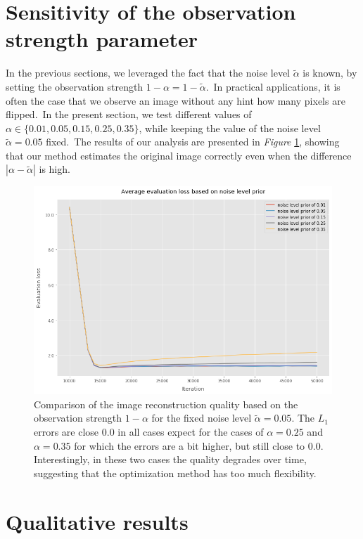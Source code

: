 \documentclass[shortabstract, english, lic]{iithesis}
\theoremstyle{default_theorem_style}\newtheorem{theorem}{Theorem}
\theoremstyle{default_theorem_style}\newtheorem{definition}{Definition}
\begin{document}
\section{Sensitivity of the observation strength parameter}

In the previous sections, we leveraged the fact that the noise level $\tilde{\alpha}$ is known, by setting
the observation strength $1 - \alpha = 1 - \tilde{\alpha}$.\ In practical applications, it is often the case that
we observe an image without any hint how many pixels are flipped.\ In the present section,
we test different values of $\alpha \in \{0.01, 0.05, 0.15, 0.25, 0.35\}$, while keeping the value of the
noise level $\tilde{\alpha} = 0.05$ fixed.\ The results of our analysis are presented in
\textit{Figure} \ref{fig:binary_noise_level_prior_plots}, showing that our method estimates the original
image correctly even when the difference $|\alpha - \tilde{\alpha}|$ is high.

\begin{figure}[H]
\centering
\includegraphics[scale=0.55]{binary_noise_level_prior_plots}
\caption{Comparison of the image reconstruction quality based on the observation strength $1 - \alpha$ for the
fixed noise level $\tilde{\alpha} = 0.05$. The $L_1$ errors are close $0.0$ in all cases expect for the cases of
$\alpha = 0.25$ and $\alpha = 0.35$ for which the errors are a bit higher, but still close to $0.0$. Interestingly,
in these two cases the quality degrades over time, suggesting that the optimization method has too
much flexibility.}
\label{fig:binary_noise_level_prior_plots}
\end{figure}

\section{Qualitative results}
\end{document}
